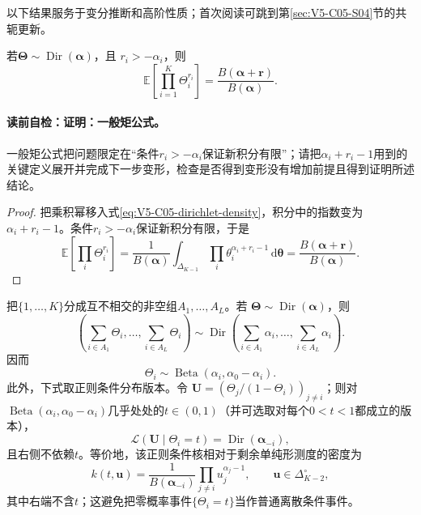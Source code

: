 以下结果服务于变分推断和高阶性质；首次阅读可跳到第\ref{sec:V5-C05-S04}节的共轭更新。

\begin{proposition}[一般矩公式]\label{prop:V5-C05-general-moment}
若$\boldsymbol\Theta\sim\operatorname{Dir}(\boldsymbol\alpha)$，且
$r_i>-\alpha_i$，则
\begin{equation}\label{eq:V5-C05-general-moment}
\mathbb E\!\left[\prod_{i=1}^K\Theta_i^{r_i}\right]
=\frac{B(\boldsymbol\alpha+\boldsymbol r)}
{B(\boldsymbol\alpha)}.
\end{equation}
\end{proposition}
\paragraph{读前自检：证明：一般矩公式。}一般矩公式把问题限定在“条件$r_i>-\alpha_i$保证新积分有限”；请把$\alpha_i+r_i-1$用到的关键定义展开并完成下一步变形，检查是否得到变形没有增加前提且得到证明所述结论。\par

\begin{proof}
把乘积幂移入式\eqref{eq:V5-C05-dirichlet-density}，积分中的指数变为
$\alpha_i+r_i-1$。条件$r_i>-\alpha_i$保证新积分有限，于是
\[
\mathbb E\!\left[\prod_i\Theta_i^{r_i}\right]
=\frac1{B(\boldsymbol\alpha)}
\int_{\Delta_{K-1}}\prod_i
\theta_i^{\alpha_i+r_i-1}\,\mathrm d\boldsymbol\theta
=\frac{B(\boldsymbol\alpha+\boldsymbol r)}
{B(\boldsymbol\alpha)}.
\]
\end{proof}

\begin{proposition}[聚合与条件性质]\label{prop:V5-C05-aggregation}
把$\{1,\ldots,K\}$分成互不相交的非空组$A_1,\ldots,A_L$。若
$\boldsymbol\Theta\sim\operatorname{Dir}(\boldsymbol\alpha)$，则
\[
\left(\sum_{i\in A_1}\Theta_i,\ldots,
\sum_{i\in A_L}\Theta_i\right)
\sim\operatorname{Dir}\!\left(
\sum_{i\in A_1}\alpha_i,\ldots,
\sum_{i\in A_L}\alpha_i\right).
\]
因而
\begin{equation}\label{eq:V5-C05-beta-marginal}
\Theta_i\sim\operatorname{Beta}(\alpha_i,\alpha_0-\alpha_i).
\end{equation}
此外，下式取正则条件分布版本。令
$\boldsymbol U=(\Theta_j/(1-\Theta_i))_{j\ne i}$；则对
$\operatorname{Beta}(\alpha_i,\alpha_0-\alpha_i)$几乎处处的$t\in(0,1)$（并可选取对每个$0<t<1$都成立的版本），
\begin{equation}\label{eq:V5-C05-normalized-conditional}
\mathcal L(\boldsymbol U\mid\Theta_i=t)
=\operatorname{Dir}(\boldsymbol\alpha_{-i}),
\end{equation}
且右侧不依赖$t$。等价地，该正则条件核相对于剩余单纯形测度的密度为
\[
k(t,\boldsymbol u)
=\frac{1}{B(\boldsymbol\alpha_{-i})}
  \prod_{j\ne i}u_j^{\alpha_j-1},
\qquad \boldsymbol u\in\Delta_{K-2}^{\circ},
\]
其中右端不含$t$；这避免把零概率事件$\{\Theta_i=t\}$当作普通离散条件事件。
\end{proposition}

